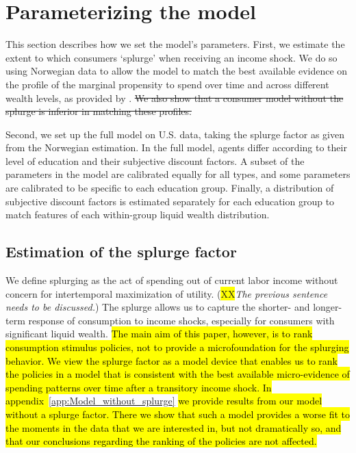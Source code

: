 \documentclass[\econtexRoot/HAFiscal]{subfiles}
\begin{document}
\hypertarget{parameterizing-the-model}{}\par\section{Parameterizing the model}

This section describes how we set the model's parameters. First, we estimate the extent to which consumers `splurge' when receiving an income shock. We do so using Norwegian data to allow the model to match the best available evidence on the profile of the marginal propensity to spend over time and across different wealth levels, as provided by \citet{fagereng_mpc_2021}. \sout{We also show that a consumer model without the splurge is inferior in matching these profiles.}

Second, we set up the full model on U.S. data, taking the splurge factor as given from the Norwegian estimation. In the full model, agents differ according to their level of education and their subjective discount factors. A subset of the parameters in the model are calibrated equally for all types, and some parameters are calibrated to be specific to each education group. Finally, a distribution of subjective discount factors is estimated separately for each education group to match features of each within-group liquid wealth distribution. 

\hypertarget{estimation-of-the-splurge-factor}{}\par\subsection{Estimation of the splurge factor}
\notinsubfile{\label{sec:splurge}}

We define splurging as the act of spending out of current labor income without concern for intertemporal maximization of utility. (\colorbox{yellow}{XX}\textit{The previous sentence needs to be discussed.}) The splurge allows us to capture the shorter- and longer-term response of consumption to income shocks, especially for consumers with significant liquid wealth. \hl{The main aim of this paper, however, is to rank consumption stimulus policies, not to provide a microfoundation for the splurging behavior. We view the splurge factor as a model device that enables us to rank the policies in a model that is consistent with the best available micro-evidence of spending patterns over time after a transitory income shock. In appendix~}\ref{app:Model_without_splurge} \hl{we provide results from our model without a splurge factor. There we show that such a model provides a worse fit to the moments in the data that we are interested in, but not dramatically so, and that our conclusions regarding the ranking of the policies are not affected.}
\end{document}
